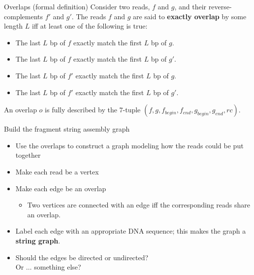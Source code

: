 \documentclass[xcolor=dvipsnames]{beamer}
\newcommand{\LengthVar}{L}
\begin{document}
\begin{frame}{Overlaps (formal definition)}
    Consider two reads, $f$ and $g$, and their reverse-complements $f'$ and $g'$.
    The reads $f$ and $g$ are said to {\bf exactly overlap} by some length
    $\LengthVar$ iff at least one of the following is true:
    \begin{itemize}
        \item The last $\LengthVar$ bp of $f$ exactly match the first
        $\LengthVar$ bp of $g$.
        \item The last $\LengthVar$ bp of $f$ exactly match the first
        $\LengthVar$ bp of $g'$.
        \item The last $\LengthVar$ bp of $f'$ exactly match the first
        $\LengthVar$ bp of $g$.
        \item The last $\LengthVar$ bp of $f'$ exactly match the first
        $\LengthVar$ bp of $g'$.
    \end{itemize}
    An overlap $o$ is fully described by the 7-tuple $(f, g, f_{begin}, f_{end},
    g_{begin}, g_{end}, rc)$.
\end{frame}

\begin{frame}{Build the fragment string assembly graph}
    \begin{itemize}
        \item Use the overlaps to construct a graph modeling how the reads could
              be put together
        \item Make each read be a vertex
        \item Make each edge be an overlap
        \begin{itemize}
            \item Two vertices are connected with an edge iff the
            corresponding reads share an overlap.
        \end{itemize}
        \item Label each edge with an appropriate DNA sequence; this makes the
        graph a {\bf string graph}.
        \item Should the edges be directed or undirected?  \\Or $\dots$ something
        else?
    \end{itemize}
\end{frame}
\end{document}
